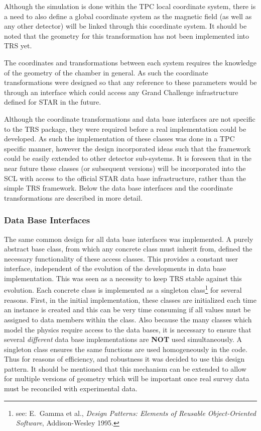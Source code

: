 \documentclass[twoside]{article}
\newcommand{\name}[1]{\textsf{#1}}%
\begin{document}
Although the simulation is done within the TPC local coordinate system,
there is a need to also define a global coordinate system as the 
magnetic field (as well as any other detector) will be linked through
this coordinate system.  It should be noted that the geometry for
this transformation has not been implemented into \name{TRS} yet.

The coordinates and transformations between each system requires the
knowledge of the geometry of the chamber in general.  As such the
coordinate transformations were designed so that any reference to
these parameters would be through an interface
which could access any Grand Challenge 
infrastructure defined for STAR in the future.

Although the coordinate transformations and data base interfaces
are not specific to the \name{TRS} package, they were required before
a  real implementation could be developed.  As such the implementation
of these classes was done in a TPC
specific manner, however the design incorporated ideas such that the
framework could be easily extended to other detector sub-systems.  
It is foreseen that in the near future these classes (or subsequent versions) 
will be incorporated into the \name{SCL} with access to the official
STAR data base infrastructure, rather than the simple \name{TRS} framework.
Below the data base interfaces
and the coordinate transformations are described in more detail.
 
\subsubsection{Data Base Interfaces}

The same common design for all data base interfaces was implemented.
A purely abstract base class, from which any concrete class must inherit
from, defined the necessary functionality of these access classes.
This provides a constant user interface, independent
of the evolution of the developments in data base implementation.
This was seen as a necessity to keep \name{TRS} stable against this
evolution.  Each concrete class is implemented as
a singleton class\footnote{see: E.~Gamma et al.,
  {\em Design Patterns: Elements of Reusable Object-Oriented Software}, Addison-Wesley 1995.}
for several reasons.  
First, in the initial implementation, these classes are initialized
each time an instance is created and this can be very time consuming if
all values must be assigned to data members within the class.
Also because the many classes which model the physics require access
to the data bases, it is necessary to ensure that several {\em different}
data base implementations are {\bf NOT} used simultaneously.
A singleton class ensures the same functions are used homogeneously
in the code.  Thus for reasons of efficiency, and robustness it was
decided to use this design pattern.  It should be mentioned that this
mechanism can be extended to allow for multiple versions of geometry
which will be important once real survey data must be reconciled
with experimental data.
\end{document}
